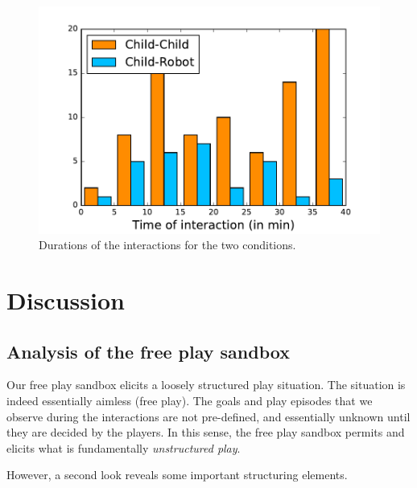 \documentclass[sigconf]{acmart}
\begin{document}
\begin{figure}
    \centering
    \includegraphics[width=0.9\columnwidth]{durations}
    \caption{Durations of the interactions for the two conditions.}

    \label{fig|durations}
\end{figure}



\section{Discussion}
\label{sec:discussion}

\subsection{Analysis of the free play sandbox}

Our free play sandbox elicits a loosely structured play situation. The
situation is indeed essentially aimless (free play). The goals and play episodes
that we observe during the interactions are not pre-defined, and essentially
unknown until they are decided by the players. In this sense, the free play
sandbox permits and elicits what is fundamentally \emph{unstructured play}.

However, a second look reveals some important structuring elements.
\end{document}
